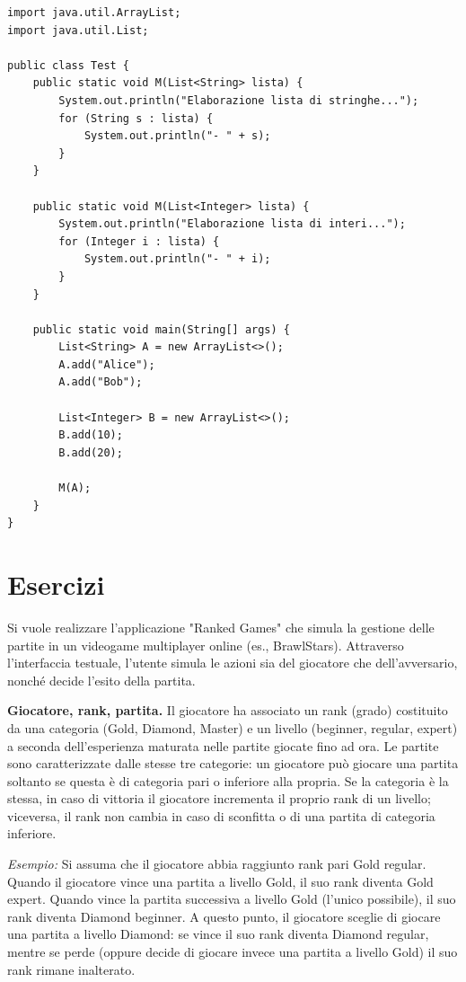 \documentclass{article}
\begin{document}
\begin{verbatim}
import java.util.ArrayList;
import java.util.List;

public class Test {
    public static void M(List<String> lista) {
        System.out.println("Elaborazione lista di stringhe...");
        for (String s : lista) {
            System.out.println("- " + s);
        }
    }
    
    public static void M(List<Integer> lista) {
        System.out.println("Elaborazione lista di interi...");
        for (Integer i : lista) {
            System.out.println("- " + i);
        }
    }

    public static void main(String[] args) {
        List<String> A = new ArrayList<>();
        A.add("Alice");
        A.add("Bob");

        List<Integer> B = new ArrayList<>();
        B.add(10);
        B.add(20);

        M(A);
    }
}
\end{verbatim}

\begin{tcolorbox}[
    width=\textwidth,
    height=5cm,
    valign=center, %
    halign=center, %
    sharp corners  %
]
\end{tcolorbox}

\section{Esercizi}
Si vuole realizzare l'applicazione "Ranked Games" che simula la gestione delle partite in un videogame multiplayer online (es., BrawlStars). Attraverso l'interfaccia testuale, l'utente simula le azioni sia del giocatore che dell'avversario, nonché decide l'esito della partita.

\textbf{Giocatore, rank, partita.} Il giocatore ha associato un rank (grado) costituito da una categoria (Gold, Diamond, Master) e un livello (beginner, regular, expert) a seconda dell'esperienza maturata nelle partite giocate fino ad ora. Le partite sono caratterizzate dalle stesse tre categorie: un giocatore può giocare una partita soltanto se questa è di categoria pari o inferiore alla propria. Se la categoria è la stessa, in caso di vittoria il giocatore incrementa il proprio rank di un livello; viceversa, il rank non cambia in caso di sconfitta o di una partita di categoria inferiore.

\textit{Esempio:} Si assuma che il giocatore abbia raggiunto rank pari Gold regular. Quando il giocatore vince una partita a livello Gold, il suo rank diventa Gold expert. Quando vince la partita successiva a livello Gold (l'unico possibile), il suo rank diventa Diamond beginner. A questo punto, il giocatore sceglie di giocare una partita a livello Diamond: se vince il suo rank diventa Diamond regular, mentre se perde (oppure decide di giocare invece una partita a livello Gold) il suo rank rimane inalterato.
\end{document}
